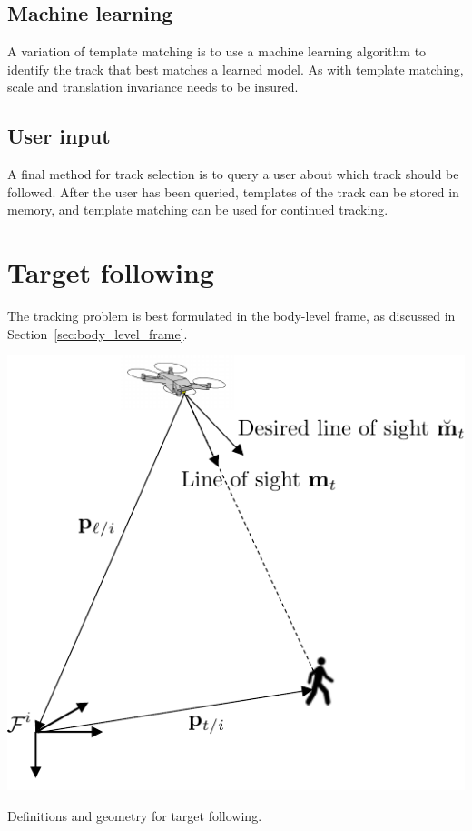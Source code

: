 \subsection{Machine learning}
A variation of template matching is to use a machine learning algorithm to identify the track that best matches a learned model.  As with template matching, scale and translation invariance needs to be insured.

\subsection{User input}
A final method for track selection is to query a user about which track should be followed.  After the user has been queried, templates of the track can be stored in memory, and template matching can be used for continued tracking.


\section{Target following}
\label{sec:target_following}

The tracking problem is best formulated in the body-level frame, as discussed in Section~\ref{sec:body_level_frame}.  

\begin{marginfigure}
	\includegraphics[width=\linewidth]{chap10_tracking/figures/target_following}
	\caption{Definitions and geometry for target following.}
	\label{fig:following}
\end{marginfigure}


